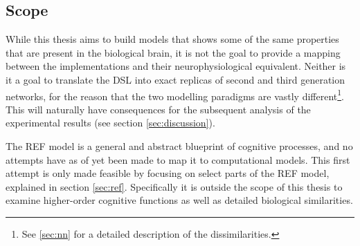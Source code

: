 \documentclass[report.tex]{subfiles}
\begin{document}
\subsection{Scope} \label{sec:scope}
While this thesis aims to build models that shows some of the same
properties that are present in the biological brain,  
it is not the goal to provide a mapping between the
implementations and their neurophysiological equivalent.
Neither is it a goal to translate the \gls{DSL} into exact replicas
of second and third generation networks, for the reason that the
two modelling paradigms are vastly different\footnote{See \ref{sec:nn}
for a detailed description of the dissimilarities.}.
This will naturally have consequences for the subsequent analysis of the
experimental results (see section \ref{sec:discussion}).

The \gls{REF} model is a general and abstract blueprint of cognitive
processes, and no attempts have as of yet been made to map it to
computational models.
This first attempt is only made feasible by focusing on select parts
of the \gls{REF} model, explained in section \ref{sec:ref}.
Specifically it is outside the scope of this thesis to examine
higher-order cognitive functions as well as detailed biological
similarities.
\end{document}
